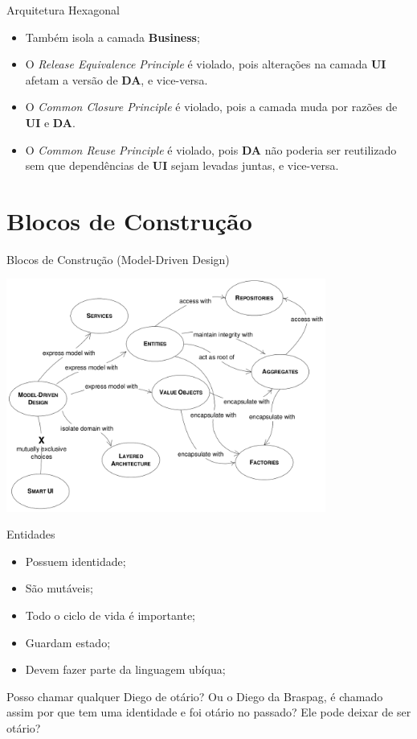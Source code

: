\documentclass[aspectratio=169]{beamer}
\begin{document}
\begin{frame}{Arquitetura Hexagonal}			
	\begin{itemize}	
		\item Também isola a camada \textbf{Business};
		\item O \textit{Release Equivalence Principle} é violado, pois  alterações na camada \textbf{UI} afetam a versão de \textbf{DA}, e vice-versa. 
		\item O \textit{Common Closure Principle} é violado, pois a camada muda por razões de \textbf{UI} e \textbf{DA}. 
		\item O \textit{Common Reuse Principle} é violado, pois \textbf{DA} não poderia ser reutilizado sem que dependências de \textbf{UI} sejam levadas juntas, e vice-versa.
	\end{itemize}
\end{frame}

\section{Blocos de Construção}
\begin{frame}{Blocos de Construção (Model-Driven Design)}	
	\begin{center}
		\includegraphics[width=10.5cm]{imgs/building_blocks}
	\end{center}
\end{frame}

\begin{frame}{Entidades}	
	\begin{itemize}	
		\item Possuem identidade;
		\item São mutáveis;
		\item Todo o ciclo de vida é importante;
		\item Guardam estado;
		\item Devem fazer parte da linguagem ubíqua;
	\end{itemize}

	Posso chamar qualquer Diego de otário? Ou o Diego da Braspag, é chamado assim por que tem uma identidade e foi otário no passado? Ele pode deixar de ser otário?
\end{frame}
\end{document}
